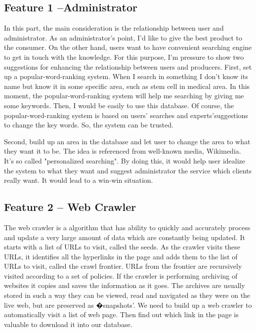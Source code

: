 \documentclass[a4paper]{article} %
\begin{document}
\subsection*{Feature 1 --Administrator}
\label{task1:part1}

In this part, the main consideration is the relationship between user and administrator. As an administrator's point, I'd like to give the best product to the consumer. On the other hand, users want to have convenient searching engine to get in touch with the knowledge. For this purpose, I'm pressure to show two suggestions for enhancing the relationship between users and producers. First, set up a popular-word-ranking system. When I search in something I don't know its name but know it in some specific area, such as stem cell in medical area. In this moment, the popular-word-ranking system will help me searching by giving me some keywords. Then, I would be easily to use this database. Of course, the popular-word-ranking system is based on users' searches and experts'suggestions to change the key words. So, the system can be trusted. 

Second, build up an area in the database and let user to change the area to what they want it to be. The idea is referenced from well-known media, Wikimedia. It's so called "personalized searching". By doing this, it would help user idealize the system to what they want and suggest administrator the service which clients really want. It would lead to a win-win situation.

\subsection*{Feature 2 -- Web Crawler}
\label{task1:feature2}

The web crawler is a algorithm that has ability to quickly and accurately process and update a very large amount of data which are constantly being updated.\cite{Liu2012} It starts with a list of URLs to visit, called the seeds. As the crawler visits these URLs, it identifies all the hyperlinks in the page and adds them to the list of URLs to visit, called the crawl frontier. URLs from the frontier are recursively visited according to a set of policies. If the crawler is performing archiving of websites it copies and saves the information as it goes. The archives are usually stored in such a way they can be viewed, read and navigated as they were on the live web, but are preserved as �snapshots'.\cite{Du2013} We need to build up a web crawler to automatically visit a list of web page. Then find out which link in the page is valuable to download it into our database. 
 
\end{document}
